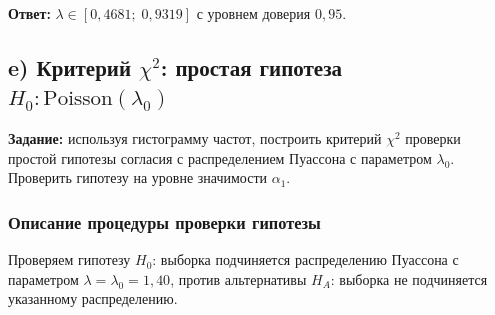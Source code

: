 \documentclass[12pt,a4paper]{article}
\begin{document}
	\textbf{Ответ:} $\lambda \in [0{,}4681;\; 0{,}9319]$ с уровнем доверия $0{,}95$.
	
	\subsection{e) Критерий \texorpdfstring{$\chi^2$}{chi2}: простая гипотеза
		\texorpdfstring{$H_0\colon\mathrm{Poisson}(\lambda_0)$}{}}
	
	\textbf{Задание:} используя гистограмму частот, построить критерий $\chi^2$
	проверки простой гипотезы согласия с распределением Пуассона с параметром $\lambda_0$.
	Проверить гипотезу на уровне значимости $\alpha_1$.
	
	\subsubsection*{Описание процедуры проверки гипотезы}
	
	Проверяем гипотезу $H_0$: выборка подчиняется распределению Пуассона
	с параметром $\lambda = \lambda_0 = 1{,}40$, против альтернативы $H_A$:
	выборка не подчиняется указанному распределению.
	
\end{document}
